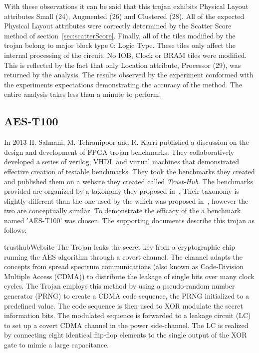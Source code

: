 With these observations it can be said that this trojan exhibits Physical Layout attributes Small (24), Augmented (26) and Clustered (28). 
All of the expected Physical Layout attributes were correctly determined by the Scatter Score method of section~\ref{sec:scatterScore}.
Finally, all of the tiles modified by the trojan belong to major block type 0: Logic Type.
These tiles only affect the internal processing of the circuit.
No \acrshort{IOB}, Clock or \acrshort{BRAM} tiles were modified.
This is reflected by the fact that only Location attribute, Processor (29), was returned by the analysis.
The results observed by the experiment conformed with the experiments expectations demonstrating the accuracy of the method.
The entire analysis takes less than a minute to perform.
\subsection{AES-T100} \label{sec:aesT100}
In 2013 H. Salmani, M. Tehranipoor and R. Karri published a discussion on the design and development of \acrshort{FPGA} trojan benchmarks.
They collaboratively developed a series of verilog, VHDL and virtual machines that demonstrated effective creation of testable benchmarks.
They took the benchmarks they created and published them on a website they created called \textit{Trust-Hub}.
The benchmarks provided are organized by a taxonomy they proposed in~\cite{trustHubPaper}.
Their taxonomy is slightly different than the one used by the \NameNoPeriod which was proposed in~\cite{samerAttribute}, however the two are conceptually similar.
To demonstrate the efficacy of the \NameNoPeriod a benchmark named 'AES-T100' was chosen. 
The supporting documents describe this trojan as follows:
\begin{displaycquote}{trusthubWebsite}
	The Trojan leaks the secret key from a cryptographic chip running the AES algorithm through a covert channel. The channel adapts the concepts from spread spectrum communications (also known as Code-Division Multiple Access (CDMA)) to distribute the leakage of single bits over many clock cycles. The Trojan employs this method by using a pseudo-random number generator (PRNG) to create a CDMA code sequence, the PRNG initialized to a predefined value. The code sequence is then used to XOR modulate the secret information bits. The modulated sequence is forwarded to a leakage circuit (LC) to set up a covert CDMA channel in the power side-channel. The LC is realized by connecting eight identical flip-flop elements to the single output of the XOR gate to mimic a large capacitance.
\end{displaycquote}

